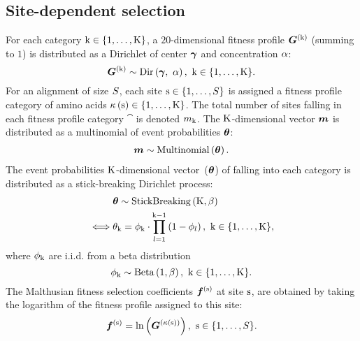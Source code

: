 \subsection{Site-dependent selection}
\label{sec:profiles}
For each category $\text{k} \in \{1, \hdots, \text{K}\}$, a $20$-dimensional fitness profile $\bm{G}^{(\text{k})}$ (summing to $1$) is distributed as a Dirichlet of center $\bm{\gamma}$ and concentration $\alpha$:
\begin{equation}
    \label{eq:DistribBase}
    \Profile\catexp \sim \mathrm{Dir}\left( \centerProfile,\ \concentrationProfile \right),\ \Setcat.
\end{equation}
For an alignment of size $S$, each site $\text{s} \in \{1, \hdots, S\}$ is assigned a fitness profile category of amino acids $\kappa\left(\text{s}\right) \in \{1, \hdots, \text{K}\} $.
The total number of sites falling in each fitness profile category $\cat$ is denoted $m_{\text{k}}$.
The $\text{K}$-dimensional vector $\bm{m}$ is distributed as a multinomial of event probabilities $\bm{\theta}$:
\begin{align}
    \label{eq:DistribMultinomial}
    \catMultiVar \sim \mathrm{Multinomial}\left( \StickBreaking \right).
\end{align}
The event probabilities $\text{K}$-dimensional vector~($\bm{\theta}$) of falling into each category is distributed as a stick-breaking \gls{Dirichlet process}:
\begin{align}
    \label{eq:DistribStickBreaking}
    \begin{split}
        & \StickBreaking \sim \mathrm{StickBreaking}\left( \Ncat, \stickbreakinghyper \right)\\
        \iff & \stickbreaking_{\cat} = \stick_{\cat}\cdot \prod _{{\indice=1}}^{{\cat-1}}\left(1-\stick_{\indice}\right),\ \Setcat,
    \end{split}
\end{align}
where $\phi_{\text{k}}$ are i.i.d.
from a beta distribution
\begin{equation}
    \label{eq:Beta}
    \stick_{\cat} \sim \mathrm{Beta}\left( 1, \stickbreakinghyper \right),\ \Setcat.
\end{equation}
The Malthusian fitness selection coefficients $\bm{f}^{(\text{s})}$ at site $\text{s}$, are obtained by taking the logarithm of the fitness profile assigned to this site:
\begin{equation}
    \label{eq:sitefitness}
    \Fit\siteexp = \ln \left( \Profile^{\left( \catsite \right)} \right),\ \Setsite.
\end{equation}

